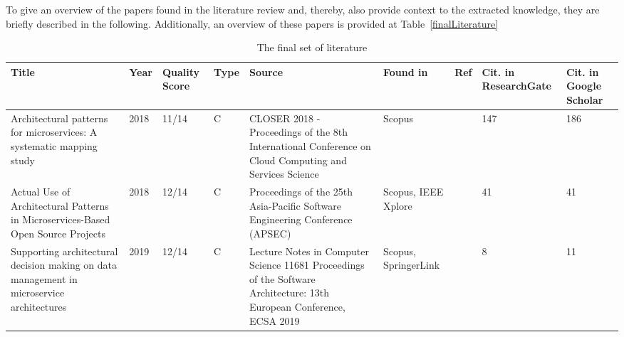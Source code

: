 \documentclass{bmcart}
\begin{document}
To give an overview of the papers found in the literature review and, thereby, also provide context to the extracted knowledge, they are briefly described in the following. Additionally, an overview of these papers is provided at Table~\ref{finalLiterature}


\begin{table}[!ht]
  \renewcommand{\arraystretch}{1.5}
  \caption[]{The final set of literature}
  \begin{tabular}{|p{4cm}|p{0.7cm}|p{0.8cm}|p{0.5cm}|p{2cm}|p{1cm}|p{0.5cm}|}
      \hline
      Title & Year & Quality Score & Type & Source & Found in & Ref & Cit. in ResearchGate & Cit. in Google Scholar \\ 

      \hline

      Architectural patterns for microservices: A systematic mapping study & 2018 & 11/14 & C & CLOSER 2018 - Proceedings of the 8th International Conference on Cloud Computing and Services Science & Scopus & \cite{Taibi.2018} & 147 & 186 \\ 
      \hline
      Actual Use of Architectural Patterns in Microservices-Based Open Source Projects & 2018 & 12/14 & C & Proceedings of the 25th Asia-Pacific Software Engineering Conference (APSEC) & Scopus, IEEE Xplore & \cite{Marquez.2018} & 41 & 41 \\ 
      \hline  
      Supporting architectural decision making on data management in microservice architectures & 2019 & 12/14 & C & Lecture Notes in Computer Science 11681
      Proceedings of the Software Architecture: 13th European Conference, ECSA 2019 & Scopus, SpringerLink & \cite{Ntentos.2019} & 8 & 11 \\ 


\end{tabular}
\end{table}
\end{document}
